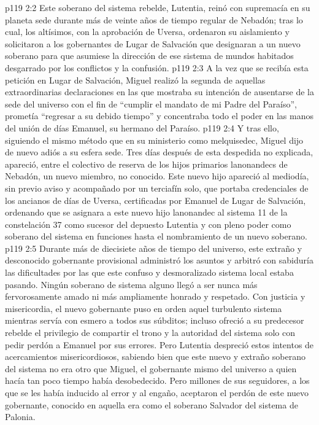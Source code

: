 \vs p119 2:2 Este soberano del sistema rebelde, Lutentia, reinó con supremacía en su planeta sede durante más de veinte años de tiempo regular de Nebadón; tras lo cual, los altísimos, con la aprobación de Uversa, ordenaron su aislamiento y solicitaron a los gobernantes de Lugar de Salvación que designaran a un nuevo soberano para que asumiese la dirección de ese sistema de mundos habitados desgarrado por los conflictos y la confusión.
\vs p119 2:3 \pc A la vez que se recibía esta petición en Lugar de Salvación, Miguel realizó la segunda de aquellas extraordinarias declaraciones en las que mostraba su intención de ausentarse de la sede del universo con el fin de “cumplir el mandato de mi Padre del Paraíso”, prometía “regresar a su debido tiempo” y concentraba todo el poder en las manos del unión de días Emanuel, su hermano del Paraíso.
\vs p119 2:4 Y tras ello, siguiendo el mismo método que en su ministerio como melquisedec, Miguel dijo de nuevo adiós a su esfera sede. Tres días después de esta despedida no explicada, apareció, entre el colectivo de reserva de los hijos primarios lanonandecs de Nebadón, un nuevo miembro, no conocido. Este nuevo hijo apareció al mediodía, sin previo aviso y acompañado por un terciafín solo, que portaba credenciales de los ancianos de días de Uversa, certificadas por Emanuel de Lugar de Salvación, ordenando que se asignara a este nuevo hijo lanonandec al sistema 11 de la constelación 37 como sucesor del depuesto Lutentia y con pleno poder como soberano del sistema en funciones hasta el nombramiento de un nuevo soberano.
\vs p119 2:5 Durante más de diecisiete años de tiempo del universo, este extraño y desconocido gobernante provisional administró los asuntos y arbitró con sabiduría las dificultades por las que este confuso y desmoralizado sistema local estaba pasando. Ningún soberano de sistema alguno llegó a ser nunca más fervorosamente amado ni más ampliamente honrado y respetado. Con justicia y misericordia, el nuevo gobernante puso en orden aquel turbulento sistema mientras servía con esmero a todos sus súbditos; incluso ofreció a su predecesor rebelde el privilegio de compartir el trono y la autoridad del sistema solo con pedir perdón a Emanuel por sus errores. Pero Lutentia despreció estos intentos de acercamientos misericordiosos, sabiendo bien que este nuevo y extraño soberano del sistema no era otro que Miguel, el gobernante mismo del universo a quien hacía tan poco tiempo había desobedecido. Pero millones de sus seguidores, a los que se les había inducido al error y al engaño, aceptaron el perdón de este nuevo gobernante, conocido en aquella era como el soberano Salvador del sistema de Palonia.
